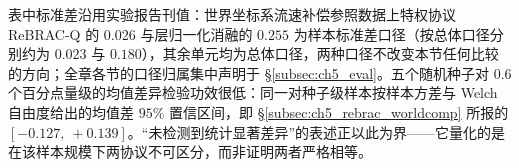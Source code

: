 表中标准差沿用实验报告刊值：世界坐标系流速补偿参照数据上特权协议 ReBRAC-Q 的 $0.026$ 与层归一化消融的 $0.255$ 为样本标准差口径（按总体口径分别约为 $0.023$ 与 $0.180$），其余单元均为总体口径，两种口径不改变本节任何比较的方向；全章各节的口径归属集中声明于 \S\ref{subsec:ch5_eval}。五个随机种子对 $0.6$ 个百分点量级的均值差异检验功效很低：同一对种子级样本按样本方差与 Welch 自由度给出的均值差 $95\%$ 置信区间，即 \S\ref{subsec:ch5_rebrac_worldcomp} 所报的 $[-0.127,\ +0.139]$。“未检测到统计显著差异”的表述正以此为界——它量化的是在该样本规模下两协议不可区分，而非证明两者严格相等。

